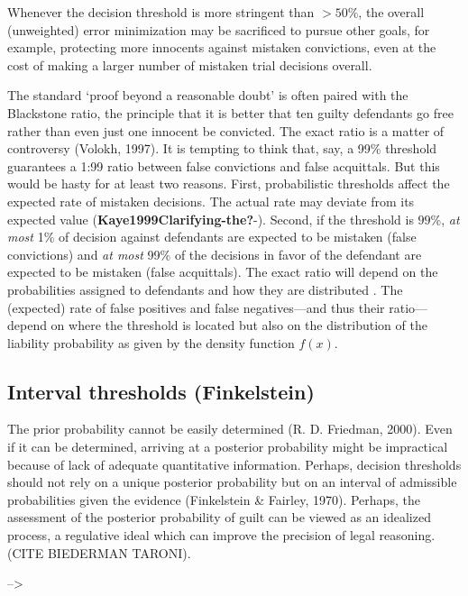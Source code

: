 \documentclass[
  10pt,
  dvipsnames,enabledeprecatedfontcommands]{scrartcl}
\begin{document}
Whenever the decision threshold is more stringent than \(>50\%\), the
overall (unweighted) error minimization may be sacrificed to pursue
other goals, for example, protecting more innocents against mistaken
convictions, even at the cost of making a larger number of mistaken
trial decisions overall.

The standard `proof beyond a reasonable doubt' is often paired with the
Blackstone ratio, the principle that it is better that ten guilty
defendants go free rather than even just one innocent be convicted. The
exact ratio is a matter of controversy (Volokh, 1997). It is tempting to
think that, say, a 99\% threshold guarantees a 1:99 ratio between false
convictions and false acquittals. But this would be hasty for at least
two reasons. First, probabilistic thresholds affect the expected rate of
mistaken decisions. The actual rate may deviate from its expected value
(\textbf{Kaye1999Clarifying-the?}-). Second, if the threshold is
\(99\%\), \textit{at most} 1\% of decision against defendants are
expected to be mistaken (false convictions) and \textit{at most} 99\% of
the decisions in favor of the defendant are expected to be mistaken
(false acquittals). The exact ratio will depend on the probabilities
assigned to defendants and how they are distributed \citep{allen2014}.
The (expected) rate of false positives and false negatives---and thus
their ratio---depend on where the threshold is located but also on the
distribution of the liability probability as given by the density
function \(f(x)\).

\hypertarget{interval-thresholds-finkelstein}{%
\subsection{Interval thresholds
(Finkelstein)}\label{interval-thresholds-finkelstein}}

The prior probability cannot be easily determined (R. D. Friedman,
2000). Even if it can be determined, arriving at a posterior probability
might be impractical because of lack of adequate quantitative
information. Perhaps, decision thresholds should not rely on a unique
posterior probability but on an interval of admissible probabilities
given the evidence (Finkelstein \& Fairley, 1970). Perhaps, the
assessment of the posterior probability of guilt can be viewed as an
idealized process, a regulative ideal which can improve the precision of
legal reasoning. (CITE BIEDERMAN TARONI).

--\textgreater{}
\end{document}
